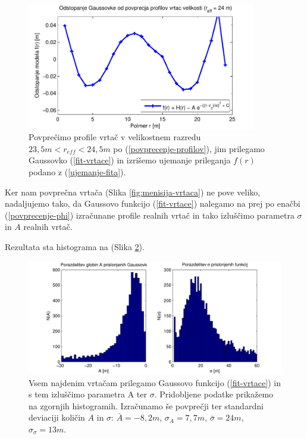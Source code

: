 \documentclass[a4paper, twoside, 12pt]{book}
\begin{document}
  \begin{figure}[h!]
    \begin{center}
      \includegraphics[width=10cm]{slike/menisija-profil-21-fit}
    \end{center}
    \caption{Povprečimo profile vrtač v velikostnem razredu \newline $23,5m < r_{eff} < 24,5m$ po (\ref{povprecenje-profilov}), jim prilegamo Gaussovko (\ref{fit-vrtace}) in izrišemo ujemanje prileganja $f(r)$ podano z (\ref{ujemanje-fita}).}
    \label{fig:menisija-profil-21-fit}
  \end{figure}
\newpage
Ker nam povprečna vrtača (Slika \ref{fig:menisija-vrtaca}) ne pove veliko, nadaljujemo tako, da Gaussovo funkcijo (\ref{fit-vrtace}) nalegamo na prej po enačbi (\ref{povprecenje-phi}) izračunane profile realnih vrtač in tako izluščimo parametra $\sigma$ in $A$ realnih vrtač.

Rezultata sta histograma na (Slika \ref{fig:menisija-globine-sigme-hist}).

  \begin{figure}[h!]
    \begin{center}
      \includegraphics[width=13cm]{slike/menisija-visine-in-sigme-hist}
    \end{center}
    \caption{Vsem najdenim vrtačam prilegamo Gaussovo funkcijo (\ref{fit-vrtace}) in s tem izluščimo parametra A ter $\sigma$. Pridobljene podatke prikažemo na zgornjih histogramih. Izračunamo še povprečji ter standardni deviaciji količin $A$ in $\sigma$: $\bar A= -8,2m$, $\sigma_A=7,7m$, $\bar \sigma=24m$, $\sigma_{\sigma}=13m$.}
    \label{fig:menisija-globine-sigme-hist}
  \end{figure}
\end{document}
